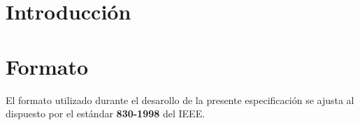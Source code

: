 \documentclass{article}
\title{\hmwkTitle}
\author{\textbf{\hmwkAuthorName}}
\date{\hmwkDueDate}
\begin{document}
\maketitle
\begin{abstract}

La definición de los requisitos de una herramienta \textit{software} facilita la comprensión por parte de todas las partes implicadas de los aspectos relevantes del mismo, además de facilitar la planificación del desarrollo del mismo con un grado de certeza mayor. El presente documento recoge los objetivos del sistema desde un enfoque basado en las necesidades de los diferentes usuarios del mismo, atendiendo a los diferentes roles desarrollados y los resultados de las diversas evaluaciones realizadas. 
\end{abstract}

\setcounter{tocdepth}{1}

\tableofcontents
\newpage

\section{Introducción}



\section{Formato}

El formato utilizado durante el desarollo de la presente especificación se ajusta al dispuesto por el estándar \textbf{830-1998} del IEEE.
\end{document}
